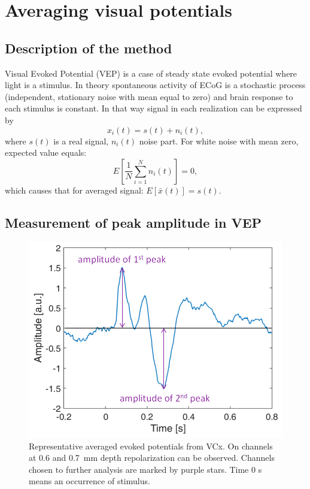 \documentclass{pracalicmgr}
\begin{document}
    \section{Averaging visual potentials}
    
    \subsection{Description of the method}
    Visual Evoked Potential (VEP) is a case of steady state evoked potential where light is a stimulus. In theory spontaneous activity of ECoG is a stochastic process (independent, stationary noise with mean equal to zero) and brain response to each stimulus is constant. In that way signal in each realization can be expressed by  
    \begin{equation}
    x_i(t) = s(t) + n_i(t),
    \end{equation}
    where $s(t)$ is a real signal, $n_i(t)$ noise part. For white noise with mean zero, expected value equals:
    \begin{equation}
    E\left[ \frac{1}{N}\sum_{i=1}^{N} n_i(t)\right] = 0, 
    \end{equation}
    which causes that for averaged signal: $E\left[ \bar{x}(t) \right] = s(t).$
    
    \subsection{Measurement of peak amplitude in VEP}
    
    \begin{figure}[H]
    	\begin{center}
    		\includegraphics[scale=0.5]{amplitude2.png}
    	\end{center}
    	\caption{ Representative averaged evoked potentials from VCx. On channels at 0.6 and 0.7~mm depth repolarization can be observed. Channels chosen to further analysis are marked by purple stars. Time 0 s means an occurrence of stimulus.}
    	\label{rys:amplitude}
    \end{figure} 
\end{document}
